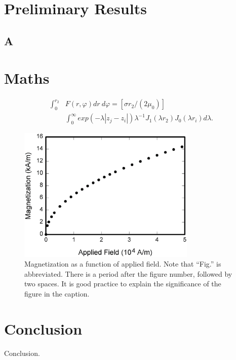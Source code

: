 \documentclass[journal]{IEEEtranTIE}
\begin{document}
\section{Preliminary Results}

\subsection{A}

\section{Maths}

\begin{align}
\nonumber\mathbf \int_{0}^{{r}_2} & F(r,\varphi) dr \ d\varphi = [\sigma{r}_2 / (2{\mu}_0)]
\\
& \int_{0}^{\infty} exp(-\lambda|{z}_j - {z}_i|){\lambda}^{-1} {J}_1 (\lambda {r}_2) {J}_0 (\lambda {r}_i) d \lambda .
\end{align}


\begin{figure}[!t]\centering
	\includegraphics[width=8.5cm]{FIG1.eps}
	\caption{Magnetization as a function of applied field. Note that ``Fig.'' is abbreviated. There is a period after the figure number, followed by two spaces. It is good practice to explain the significance of the figure in the caption.}\label{FIG_1}
\end{figure}


\section{Conclusion}

Conclusion.



\ %
\end{document}
